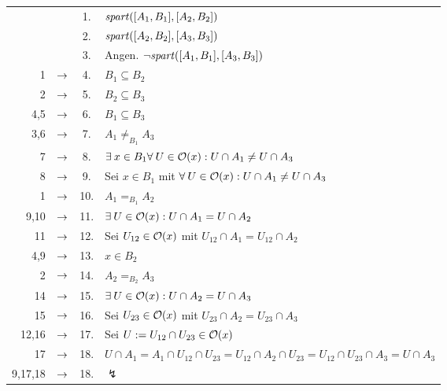 \begin{longtable}{r c c l}
    & & 1. & $\mathit{spart}([A_1,B_1],[A_2,B_2])$ \\
    & & 2. & $\mathit{spart}([A_2,B_2],[A_3,B_3])$ \\
    & & 3. & Angen. $\neg \mathit{spart}([A_1,B_1],[A_3,B_3])$ \\
    1 & $\rightarrow$ & 4. & $B_1 \subseteq B_2$ \\
    2 & $\rightarrow$ & 5. & $B_2 \subseteq B_3$ \\
    4,5 & $\rightarrow$ & 6. & $B_1 \subseteq B_3$ \\
    3,6 & $\rightarrow$ & 7. & $A_1 \neq_{B_1} A_3$ \\
    7 & $\rightarrow$ & 8. & $\exists\: x \in B_1 \forall\: U \in \mathcal{O}(x): U \cap A_1 \neq U \cap A_3$\\
    8 & $\rightarrow$ & 9. & Sei $x \in B_1$ mit $\forall\: U \in \mathcal{O}(x): U \cap A_1 \neq U \cap A_3$ \\
    1 & $\rightarrow$ & 10. & $A_1 =_{B_1} A_2$ \\
    9,10 & $\rightarrow$ & 11. & $\exists\: U \in \mathcal{O}(x): U \cap A_1 = U \cap A_2$ \\
    11 & $\rightarrow$ & 12. & Sei $U_{12} \in \mathcal{O}(x)$ mit $U_{12} \cap A_1 = U_{12} \cap A_2$  \\
    4,9 & $\rightarrow$ & 13. & $x \in B_2$ \\
    2 & $\rightarrow$ & 14. & $A_2 =_{B_2} A_3$ \\
    14 & $\rightarrow$ & 15. & $\exists\: U \in \mathcal{O}(x): U \cap A_2 = U \cap A_3$ \\
    15 & $\rightarrow$ & 16. & Sei $U_{23} \in \mathcal{O}(x)$ mit $U_{23} \cap A_2 = U_{23} \cap A_3$ \\
    12,16 & $\rightarrow$ & 17. & Sei $U := U_{12} \cap U_{23} \in \mathcal{O}(x)$ \\
    17 & $\rightarrow$ & 18. & $U \cap A_1 = A_1 \cap U_{12} \cap U_{23} = U_{12} \cap A_2 \cap U_{23} = U_{12} \cap U_{23} \cap A_3 = U \cap A_3$ \\
    9,17,18 & $\rightarrow$ & 18. & $\lightning$
\end{longtable}	

